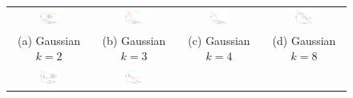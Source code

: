 \begin{figure}[!t]
  \renewcommand{\tabcolsep}{1pt}
  \begin{tabular}{cccc}
    \includegraphics[width=0.26\textwidth]{../experiment/figure/sp_sym_gauss_k_2} &      
    \includegraphics[width=0.26\textwidth]{../experiment/figure/sp_sym_gauss_k_3} &      
    \includegraphics[width=0.26\textwidth]{../experiment/figure/sp_sym_gauss_k_4} &    
    \includegraphics[width=0.26\textwidth]{../experiment/figure/sp_sym_gauss_k_8} \\    
    (a) Gaussian $k=2$ & (b) Gaussian $k=3$ & (c) Gaussian $k=4$ & (d) Gaussian $k=8$ \\ 
    \includegraphics[width=0.26\textwidth]{../experiment/figure/sp_sym_heter_k_2} &      
    \includegraphics[width=0.26\textwidth]{../experiment/figure/sp_sym_heter_k_3} &      

\end{tabular}
\end{figure}
